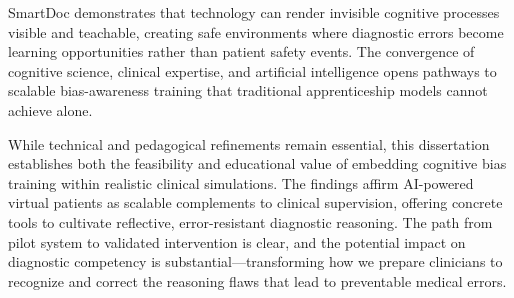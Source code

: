 SmartDoc demonstrates that technology can render invisible cognitive processes visible and teachable,
creating safe environments where diagnostic errors become learning opportunities rather than patient
safety events. The convergence of cognitive science, clinical expertise, and artificial intelligence
opens pathways to scalable bias-awareness training that traditional apprenticeship models cannot
achieve alone.

While technical and pedagogical refinements remain essential, this dissertation establishes both
the feasibility and educational value of embedding cognitive bias training within realistic clinical
simulations. The findings affirm AI-powered virtual patients as scalable complements to clinical
supervision, offering concrete tools to cultivate reflective, error-resistant diagnostic reasoning.
The path from pilot system to validated intervention is clear, and the potential impact on
diagnostic competency is substantial—transforming how we prepare clinicians to recognize and
correct the reasoning flaws that lead to preventable medical errors.
